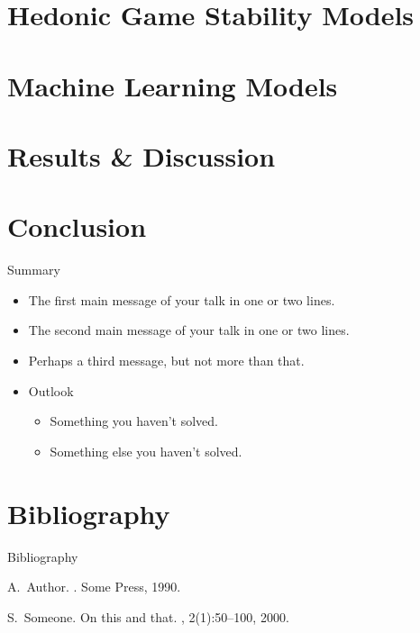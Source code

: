 \documentclass[xcolor=dvipsnames]{beamer}
\begin{document}
\section{Hedonic Game Stability Models}

\section{Machine Learning Models}

\section{Results \& Discussion}

\section{Conclusion}

\begin{frame}{Summary}
  \begin{itemize}
  \item
    The \alert{first main message} of your talk in one or two lines.
  \item
    The \alert{second main message} of your talk in one or two lines.
  \item
    Perhaps a \alert{third message}, but not more than that.
  \end{itemize}
  
  \begin{itemize}
  \item
    Outlook
    \begin{itemize}
    \item
      Something you haven't solved.
    \item
      Something else you haven't solved.
    \end{itemize}
  \end{itemize}
\end{frame}

\section*{Bibliography}
\begin{frame}{Bibliography}
  \begin{thebibliography}{10}

    A.~Author.
    .
    \newblock Some Press, 1990.

    S.~Someone.
    \newblock On this and that.
    , 2(1):50--100,
    2000.

  \end{thebibliography}
\end{frame}
\end{document}
